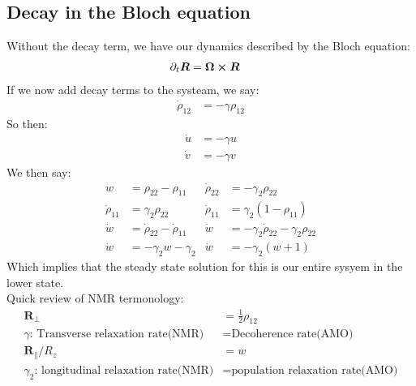 \subsection{Decay in the Bloch equation}
Without the decay term, we have our dynamics described by the Bloch equation:
\begin{align*}
	\partial_t \bm{R} &= \bm{\Omega} \cross \bm{R}
\end{align*}
If we now add decay terms to the systeam, we say:
\begin{align*}
	\dot{\rho}_{12} &= -\gamma\rho_{12}
\end{align*}
So then:
\begin{align*}
	\dot{u} &= -\gamma u \\
	\dot{v} &= -\gamma v
\end{align*}
We then say:
\begin{align*}
	w &= \rho_{22} -\rho_{11} &
	\dot{\rho}_{22} &= -\gamma_2\rho_{22} \\
	\dot{\rho}_{11} &= \gamma_2\rho_{22} &
	\dot{\rho}_{11} &= \gamma_2(1-\rho_{11}) \\
	\dot{w} &= \dot{\rho}_22 - \dot{\rho}_{11} &
	\dot{w} &= -\gamma_2\dot{\rho}_22 - \gamma_2\rho_{22} \\
	\dot{w} &= -\gamma_2 w - \gamma_2 &
	\dot{w} &= -\gamma_2 (w +1)
\end{align*}
Which implies that the steady state solution for this is our entire sysyem in the lower state. \\
Quick review of NMR termonology:
\begin{align*}
	\bm{R}_\perp &= \frac{1}{2}\rho_{12} \\
	\gamma\text{: Transverse relaxation rate(NMR)} &= \text{Decoherence rate(AMO)} \\
	\bm{R}_\parallel/R_z &= w \\
	\gamma_2\text{: longitudinal relaxation rate(NMR)} &= \text{population relaxation rate(AMO)}
\end{align*}

